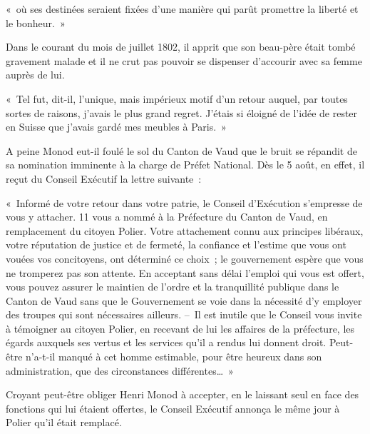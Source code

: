 \documentclass[french,twoside]{book} %
\newenvironment{quoteblock}%
  {\begin{quoting}}
  {\end{quoting}}
\newenvironment{quotebar}{%
    \def\FrameCommand{{\color{rubric!10!}\vrule width 0.5em} \hspace{0.9em}}%
    \def\OuterFrameSep{\itemsep} %
    \MakeFramed {\advance\hsize-\width \FrameRestore}
  }%
  {%
    \endMakeFramed
  }
\renewenvironment{quoteblock}%
  {%
    \savenotes
    \setstretch{0.9}
    \normalfont
    \begin{quotebar}
  }
  {%
    \end{quotebar}
    \spewnotes
  }
\begin{document}
\begin{quoteblock}
\noindent « où ses destinées seraient fixées d’une manière qui parût promettre la liberté et le bonheur. »\end{quoteblock}

\noindent Dans le courant du mois de juillet 1802, il apprit que son beau-père était tombé gravement malade et il ne crut pas pouvoir se dispenser d’accourir avec sa femme auprès de lui.\par

\begin{quoteblock}
 \noindent « Tel fut, dit-il, l’unique, mais impérieux motif d’un retour auquel, par toutes sortes de raisons, j’avais le plus grand regret. J’étais si éloigné de l’idée de rester en Suisse que j’avais gardé mes meubles à Paris. »
 \end{quoteblock}

\noindent A peine Monod eut-il foulé le sol du Canton de Vaud que le bruit se répandit de sa nomination imminente à la charge de Préfet National. Dès le 5 août, en effet, il reçut du Conseil Exécutif la lettre suivante :\par

\begin{quoteblock}
 \noindent « Informé de votre retour dans votre patrie, le Conseil d’Exécution s’empresse de vous y attacher. 11 vous a nommé à la Préfecture du Canton de Vaud, en remplacement du citoyen Polier. Votre attachement connu aux principes libéraux, votre réputation de justice et de fermeté, la confiance et l’estime que vous ont vouées vos concitoyens, ont déterminé ce choix ; le gouvernement espère que vous ne tromperez pas son attente. En acceptant sans délai l’emploi qui vous est offert, vous pouvez assurer le maintien de l’ordre et la tranquillité publique dans le Canton de Vaud sans que le Gouvernement se voie dans la nécessité d’y employer des troupes qui sont nécessaires ailleurs. – Il est inutile que le Conseil vous invite à témoigner au citoyen Polier, en recevant de lui les affaires de la préfecture, les égards auxquels ses vertus et les services qu’il a rendus lui donnent droit. Peut-être n’a-t-il manqué à cet homme estimable, pour être heureux dans son administration, que des circonstances différentes… »
 \end{quoteblock}

\noindent Croyant peut-être obliger Henri Monod à accepter, en le laissant seul en face des fonctions qui lui étaient offertes, le Conseil Exécutif annonça le même jour à Polier qu’il était remplacé.\par
\end{document}
